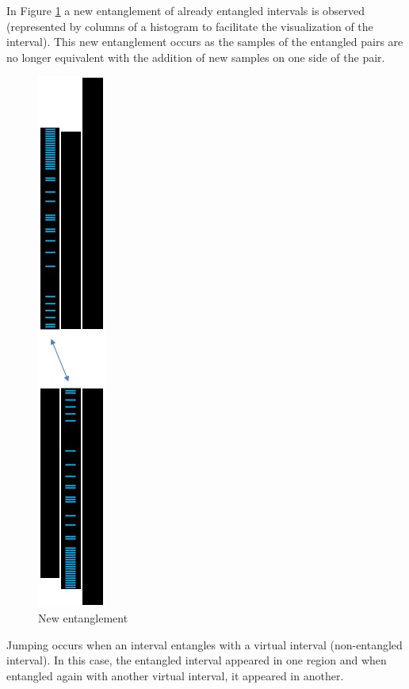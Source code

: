 In Figure \ref{fig:consciousness_space_subconscious_observation_jump} a new entanglement of already entangled intervals is observed (represented by columns of a histogram to facilitate the visualization of the interval). This new entanglement occurs as the samples of the entangled pairs are no longer equivalent with the addition of new samples on one side of the pair.
	\begin{figure}[H]
	\caption{New entanglement}
	\label{fig:consciousness_space_subconscious_observation_jump}
	\centering
	\includegraphics[scale=.53]{sections/images/consciousness_space_subconscious_observation_jump.jpg}
	\end{figure}

Jumping occurs when an interval entangles with a virtual interval (non-entangled interval). In this case, the entangled interval appeared in one region and when entangled again with another virtual interval, it appeared in another.

